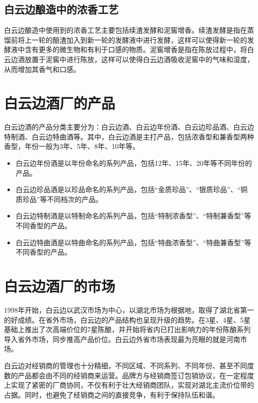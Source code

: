 \documentclass{ctexart}
\begin{document}
    \subsection{白云边酿造中的浓香工艺}
    白云边酿造中使用到的浓香工艺主要包括续渣发酵和泥窖增香。续渣发酵是指在蒸馏前将上一轮的醅渣加入到新一轮的发酵液中进行发酵，这样可以使得新一轮的发酵液中含有更多的微生物和有利于口感的物质。泥窖增香是指在陈放过程中，将白云边酒放置于泥窖中进行陈放，这样可以使得白云边酒吸收泥窖中的气味和湿度，从而增加其香气和口感。

    \section{白云边酒厂的产品}

    白云边酒的产品分类主要分为：白云边酒、白云边年份酒、白云边珍品酒、白云边特制酒、白云边特曲酒等。其中，白云边酒是主打产品，包括浓香型和兼香型两种香型，年份一般为3年、5年、8年、10年等。


    \begin{itemize}
        \item 白云边年份酒是以年份命名的系列产品，包括12年、15年、20年等不同年份的产品。
        \item 白云边珍品酒是以珍品命名的系列产品，包括“金质珍品”、“银质珍品”、“铜质珍品”等不同档次的产品。
        \item 白云边特制酒是以特制命名的系列产品，包括“特制浓香型”、“特制兼香型”等不同香型的产品。
        \item 白云边特曲酒是以特曲命名的系列产品，包括“特曲浓香型”、“特曲兼香型”等不同香型的产品。
    \end{itemize}

    \section{白云边酒厂的市场}

    1998年开始，白云边以武汉市场为中心，以湖北市场为根据地，取得了湖北省第一的好成绩。在省外市场，白云边的产品结构也呈现升级的趋势。在3星、4星、5星基础上推出了次高端价位的7星陈酿，并开始将省内已打出影响力的年份陈酿系列导入省外市场，同步推高产品价位。白云边外省市场表现最为亮眼的就是河南市场。

    白云边对经销商的管理也十分精细，不同区域、不同系列、不同年份、甚至不同度数的产品都会由不同的经销商来运营。品牌方与经销商签订包销协议，在一定程度上实现了紧密的厂商协同，不仅有利于壮大经销商团队，实现对湖北主流价位带的占据。同时，也避免了经销商之间的直接竞争，有利于保持队伍和谐。
\end{document}
